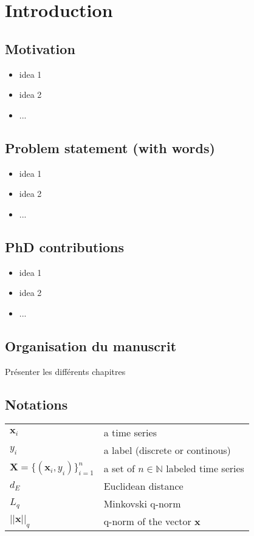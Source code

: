\chapter*{Introduction}
\label{chap:introduction}

\section*{Motivation}
\begin{itemize}
	\item idea 1
	\item idea 2
	\item ...
\end{itemize}


\section*{Problem statement (with words)}
\begin{itemize}
	\item idea 1
	\item idea 2
	\item ...
\end{itemize}

\section*{PhD contributions}
\begin{itemize}
	\item idea 1
	\item idea 2
	\item ...
\end{itemize}

\section*{Organisation du manuscrit}
Présenter les différents chapitres

\newpage
\section*{Notations}

\begin{tabular}{ll}
	$\textbf{x}_i$ 							& a time series \\ 
	$y_i$ 									& a label (discrete or continous) \\
	$\textbf{X} = \{(\textbf{x}_i , y_i)\}_{i=1}^n$ & a set of $n \in \mathbb{N}$ labeled time series \\
	$d_E$		& Euclidean distance \\
	$L_q$		& Minkovski q-norm \\
	$||\textbf{x}||_q$	& q-norm of the vector $\textbf{x}$ \\
\end{tabular} 




